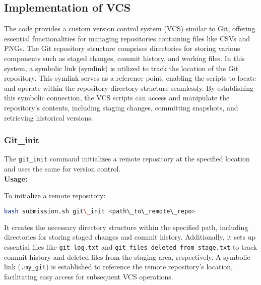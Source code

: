 \documentclass{article}
\begin{document}
\subsection{Implementation of VCS}

The code provides a custom version control system (VCS) similar to Git, offering essential functionalities for managing repositories containing files like CSVs and PNGs. The Git repository structure comprises directories for storing various components such as staged changes, commit history, and working files. In this system, a symbolic link (symlink) is utilized to track the location of the Git repository. This symlink serves as a reference point, enabling the scripts to locate and operate within the repository directory structure seamlessly. By establishing this symbolic connection, the VCS scripts can access and manipulate the repository's contents, including staging changes, committing snapshots, and retrieving historical versions.

\subsubsection{Git\_init}
The \texttt{git\_init} command initializes a remote repository at the specified location and uses the same for version control.\\
\textbf{Usage:}
\begin{adjustwidth}{0.5cm}{0cm}
To initialize a remote repository:
\begin{lstlisting}[language=bash]
bash submission.sh git\_init <path\_to\_remote\_repo>
\end{lstlisting}
\end{adjustwidth}

 It creates the necessary directory structure within the specified path, including directories for storing staged changes and commit history. Additionally, it sets up essential files like \texttt{git\_log.txt} and \texttt{git\_files\_deleted\_from\_stage.txt} to track commit history and deleted files from the staging area, respectively. A symbolic link (\texttt{.my\_git}) is established to reference the remote repository's location, facilitating easy access for subsequent VCS operations. 
\end{document}
